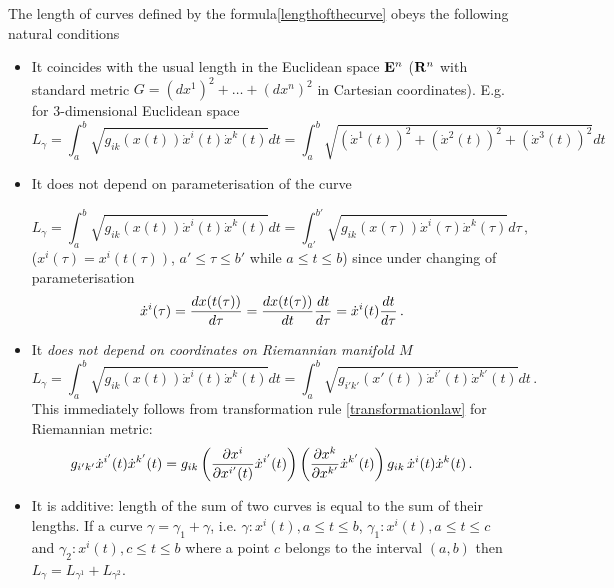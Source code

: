 \documentclass[12pt]{article}
\theoremstyle{theorem}
\numberwithin{equation}{section}
\begin{document}
{\footnotesize
The length of  curves defined by the
formula\eqref{lengthofthecurve} obeys the following natural conditions

\begin{itemize}

\item It coincides with the usual length in the Euclidean space ${\bf E}^n$
(${\bf R}^n$ with standard metric  $G=(dx^1)^2+\dots+(dx^n)^2$
in Cartesian coordinates). E.g. for $3$-dimensional Euclidean space
\begin{equation*}\label{coincidewithlength}
      L_\gamma=
  \int_a^b \sqrt {g_{ik}(x(t))\dot x^i(t) \dot x^k(t)}dt=
  \int_a^b \sqrt{(\dot x^1(t))^2+(\dot x^2(t))^2+(\dot x^3(t))^2}dt
\end{equation*}


\item It does not depend on parameterisation of the curve

\begin{equation*}\label{independenceon parameterisation}
    L_\gamma=  \int_a^b \sqrt {g_{ik}(x(t))\dot x^i(t) \dot x^k(t)}dt=
        \int_{a'}^{b'} \sqrt {g_{ik}(x(\tau))\dot x^i(\tau) \dot x^k(\tau)}
                 d\tau\,,
\end{equation*}
($x^i(\tau)=x^i(t(\tau))$,
$a'\leq \tau\leq b'$ while $a\leq t\leq b$) since under
changing of parameterisation
  $$
  \dot x^i(\tau)={dx(t(\tau))\over d\tau}=
  {dx(t(\tau))\over d t}{dt\over d\tau}=
  \dot x^i(t){dt\over d\tau}\,.
  $$


\item It {\it does not depend on coordinates on Riemannian manifold $M$}
 \begin{equation*}\label{independence on coordinates}
    L_\gamma=  \int_a^b \sqrt {g_{ik}(x(t))\dot x^i(t) \dot x^k(t)}dt=
    \int_a^b \sqrt {g_{i'k'}(x'(t))\dot x^{i'}(t) \dot x^{k'}(t)}dt\,.
 \end{equation*}
This immediately follows from transformation rule
\eqref{transformationlaw}  for Riemannian metric:
       $$
g_{i'k'}\dot x^{i'}(t) \dot x^{k'}(t)=
   g_{ik}
 \left({\partial x^i\over \partial x^{i'}(t)}\dot x^{i'}(t)\right)
 \left({\partial x^k\over \partial x^{k'}}\dot x^{k'}(t)\right)
    g_{ik}\,\dot x^{i}(t) \dot x^{k}(t)\,.
        $$
\item  It is additive: length of the sum of two curves is equal to the sum of
their lengths.
If a curve  $\gamma=\gamma_1+\gamma$, i.e.
$\gamma\colon x^i(t), a\leq t\leq b$,
$\gamma_1\colon x^i(t), a\leq t\leq c$ and
$\gamma_2\colon x^i(t), c\leq t\leq b$ where
a point $c$ belongs to the interval $(a,b)$ then
$L_{\gamma}=L_{\gamma^1}+L_{\gamma^2}$.

\end{itemize}

}
\end{document}

